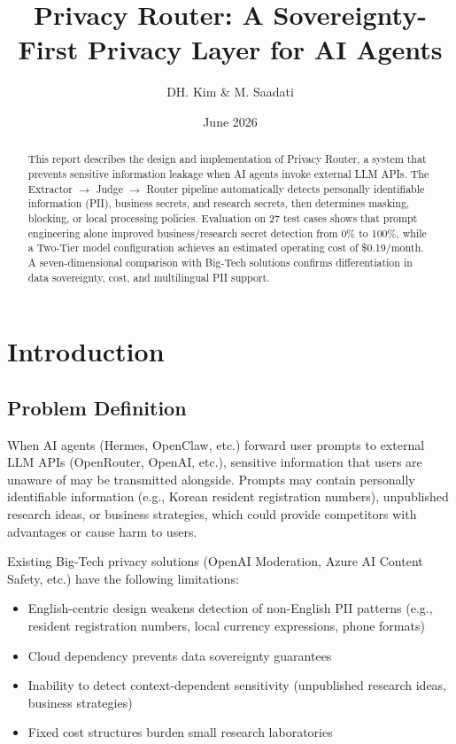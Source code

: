 \documentclass[11pt,a4paper]{article}
\title{Privacy Router: A Sovereignty-First Privacy Layer for AI Agents}
\author{DH. Kim \& M. Saadati}
\date{June 2026}
\begin{document}
\maketitle

\begin{abstract}
This report describes the design and implementation of Privacy Router, a system that prevents sensitive information leakage when AI agents invoke external LLM APIs. The Extractor $\rightarrow$ Judge $\rightarrow$ Router pipeline automatically detects personally identifiable information (PII), business secrets, and research secrets, then determines masking, blocking, or local processing policies. Evaluation on 27 test cases shows that prompt engineering alone improved business/research secret detection from 0\% to 100\%, while a Two-Tier model configuration achieves an estimated operating cost of \$0.19/month. A seven-dimensional comparison with Big-Tech solutions confirms differentiation in data sovereignty, cost, and multilingual PII support.
\end{abstract}

\tableofcontents
\newpage

\section{Introduction}

\subsection{Problem Definition}

When AI agents (Hermes, OpenClaw, etc.) forward user prompts to external LLM APIs (OpenRouter, OpenAI, etc.), sensitive information that users are unaware of may be transmitted alongside. Prompts may contain personally identifiable information (e.g., Korean resident registration numbers), unpublished research ideas, or business strategies, which could provide competitors with advantages or cause harm to users.

Existing Big-Tech privacy solutions (OpenAI Moderation, Azure AI Content Safety, etc.) have the following limitations:

\begin{itemize}[nosep]
  \item English-centric design weakens detection of non-English PII patterns (e.g., resident registration numbers, local currency expressions, phone formats)
  \item Cloud dependency prevents data sovereignty guarantees
  \item Inability to detect context-dependent sensitivity (unpublished research ideas, business strategies)
  \item Fixed cost structures burden small research laboratories
\end{itemize}
\end{document}

